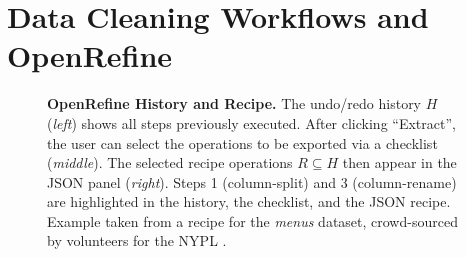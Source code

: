 \documentclass[conference]{ijdc-v14}
\newcommand{\openrefine}{\textrm{OpenRefine}\xspace}
\newcommand{\co}[1]{\textsf{\small{#1}}}
\begin{document}


\section{Data Cleaning Workflows and  \openrefine}


\begin{figure}[t]
\centering
{}
\caption{\textbf{\openrefine History and Recipe.} The {undo/redo} history $H$
(\emph{left}) shows all steps previously executed.  After clicking ``\co{Extract}'', the user can select the operations to
 be exported via a checklist (\emph{middle}). The selected recipe operations $R\subseteq H$ then appear in the JSON panel
 (\emph{right}). Steps 1 (\co{column-split}) and 3 (\co{column-rename}) are highlighted in the history, the checklist, and the JSON recipe. 
 Example taken from a recipe for the \emph{menus} dataset, crowd-sourced
 by volunteers for the NYPL \cite {whatsonmenu}.}
\label{fig:recipe}
\end{figure}
\end{document}
